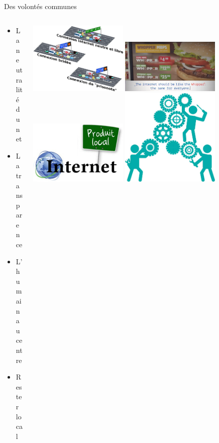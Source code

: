 \begin{frame}{Des volontés communes}
  \begin{columns}
    \begin{column}{0.4\textwidth}
      \begin{itemize}
        \item La neutralité du net
        \item La transparence
        \item L'humain au centre
        \item Rester local
      \end{itemize}
    \end{column}
    \begin{column}{0.6\textwidth}
      \includegraphics[width=0.4\textwidth]{un_autre_internet/autoroute.png}
      \includegraphics[width=0.4\textwidth]{un_autre_internet/whopper.png} \\
      \includegraphics[width=0.4\textwidth]{un_autre_internet/local.png}
      \includegraphics[width=0.4\textwidth]{un_autre_internet/groupetravail.png}
    \end{column}
  \end{columns}
\end{frame}

